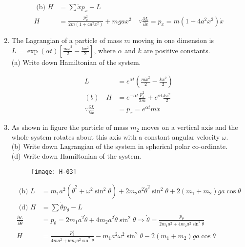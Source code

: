 \begin{enumerate}
\begin{answer}
\begin{align*}
	\text { (b) } H&=\sum \dot{x} p_{x}-L\\
	H&=\frac{p_{x}^{2}}{2 m\left(1+4 a^{2} x^{2}\right)}+m g a x^{2} \quad \because \frac{\partial L}{\partial \dot{x}}=p_{x}=m\left(1+4 a^{2} x^{2}\right) \dot{x}
	\end{align*}
\end{answer}
\item The Lagrangian of a particle of mass $m$ moving in one dimension is $L=\exp (\alpha t)\left[\frac{m \dot{x}^{2}}{2}-\frac{k x^{2}}{2}\right]$, where $\alpha$ and $k$ are positive constants.\\
(a) Write down Hamiltonian of the system.
\begin{answer}
	\begin{align*}
	L&=e^{\alpha t}\left(\frac{m \dot{x}^{2}}{2}-\frac{k x^{2}}{2}\right)\\
	(b) \quad H&=e^{-\alpha t} \frac{p_{x}^{2}}{2 m}+e^{\alpha t} \frac{k x^{2}}{2}\\
	\because \frac{\partial L}{\partial \dot{x}}&=p_{x}=e^{\alpha t} m \dot{x}
	\end{align*}
\end{answer}
\item As shown in figure the particle of mass $m_{2}$ moves on a vertical axis and the whole system rotates about this axis with a constant angular velocity $\omega$.\\
(b) Write down Lagrangian of the system in spherical polar co-ordinate.\\
(d) Write down Hamiltonian of the system.
\begin{figure}[H]
	\centering
	\texttt{[image: H-03]}
\end{figure}
\begin{answer}
	\begin{align*}
	\text { (b) } L&=m_{1} a^{2}\left(\dot{\theta}^{2}+\omega^{2} \sin ^{2} \theta\right)+2 m_{2} a^{2} \dot{\theta}^{2} \sin ^{2} \theta+2\left(m_{1}+m_{2}\right) g a \cos \theta\\
	\text { (d) } H&=\sum \dot{\theta} p_{\theta}-L\\
	\frac{\partial L}{\partial \dot{\theta}}&=p_{\theta}=2 m_{1} a^{2} \dot{\theta}+4 m_{2} a^{2} \dot{\theta} \sin ^{2} \theta \Rightarrow \dot{\theta}=\frac{p_{\theta}}{2 m_{1} a^{2}+4 m_{2} a^{2} \sin ^{2} \theta}\\
	H&=\frac{p_{\theta}^{2}}{4 m a^{2}+\theta m_{2} a^{2} \sin ^{2} \theta}-m_{1} a^{2} \omega^{2} \sin ^{2} \theta-2\left(m_{1}+m_{2}\right) g a \cos \theta

\end{align*}
\end{answer}
\end{enumerate}

